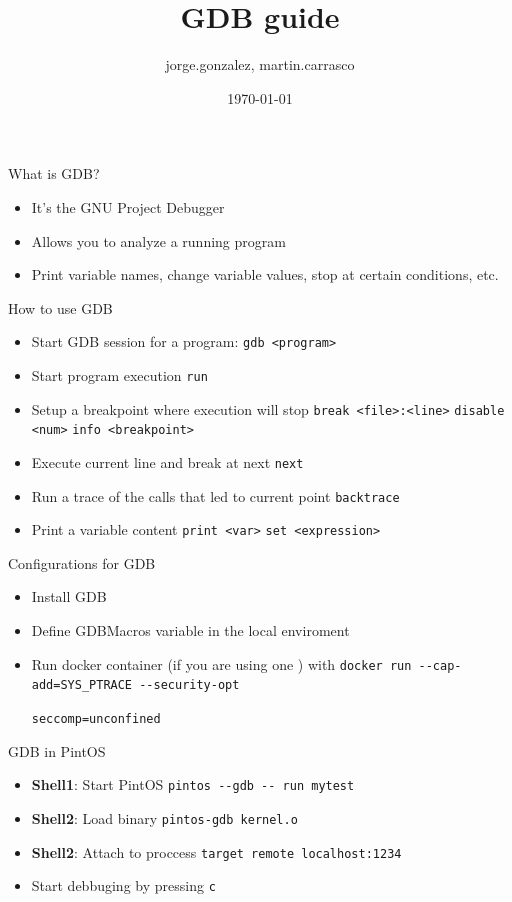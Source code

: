\documentclass{beamer}
\title{GDB guide}
\author{jorge.gonzalez, martin.carrasco}
\date{\today}
\begin{document}
\maketitle

\begin{frame}{What is GDB?}
    \begin{itemize}
        \item<1-> It's the GNU Project Debugger
        \item<2-> Allows you to analyze a running program
        \item<3-> Print variable names, change variable values, stop at certain conditions, etc.
    \end{itemize}
\end{frame}

\begin{frame}{How to use GDB}
	\begin{itemize}
    	\item<1-> Start GDB session for a program: \lstinline{gdb <program>}
    	\item<2-> Start program execution \lstinline{run}
    	\item<3-> Setup  a breakpoint where execution will stop \lstinline{break <file>:<line>} \lstinline{disable <num>} \lstinline{info <breakpoint>}
    	\item<4-> Execute current line and break at next \lstinline{next}
    	\item<5-> Run a trace of the calls that led to current point \lstinline{backtrace}
   		\item<6-> Print a variable content \lstinline{print <var>} \lstinline{set <expression>}
    \end{itemize}
\end{frame}

\begin{frame}{Configurations for GDB}
	\begin{itemize}
        \item Install GDB
    	\item Define GDBMacros variable in the local enviroment
        \item Run docker container (if you are using one ) with \lstinline{docker run --cap-add=SYS_PTRACE --security-opt} \par \lstinline{seccomp=unconfined}
	\end{itemize}
\end{frame}

\begin{frame}{GDB in PintOS}
	\begin{itemize}
		\item<1-> \textbf{Shell1}: Start PintOS \lstinline{pintos --gdb -- run mytest}
		\item<2-> \textbf{Shell2}: Load binary \lstinline{pintos-gdb kernel.o}
        \item<3-> \textbf{Shell2}: Attach to proccess \lstinline{target remote localhost:1234}
        \item<4-> Start debbuging by pressing \lstinline{c}
	\end{itemize}
\end{frame}
\end{document}
